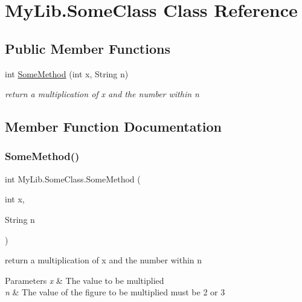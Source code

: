 \hypertarget{class_my_lib_1_1_some_class}{}\section{My\+Lib.\+Some\+Class Class Reference}
\label{class_my_lib_1_1_some_class}
\subsection*{Public Member Functions}
\begin{DoxyCompactItemize}
\item 
int \mbox{\hyperlink{class_my_lib_1_1_some_class_a9fbf42177002a01f663469744423d9ff}{Some\+Method}} (int x, String n)
\begin{DoxyCompactList}\small\item\em return a multiplication of x and the number within n \end{DoxyCompactList}\end{DoxyCompactItemize}


\subsection{Member Function Documentation}
\mbox{\label{class_my_lib_1_1_some_class_a9fbf42177002a01f663469744423d9ff}} 
\subsubsection{\texorpdfstring{SomeMethod()}{SomeMethod()}}
{\footnotesize\ttfamily int My\+Lib.\+Some\+Class.\+Some\+Method (\begin{DoxyParamCaption}\item[{int}]{x,  }\item[{String}]{n }\end{DoxyParamCaption})\hspace{0.3cm}{\ttfamily [inline]}}



return a multiplication of x and the number within n 


\begin{DoxyParams}{Parameters}
{\em x} & The value to be multiplied\\
\hline
{\em n} & The value of the figure to be multiplied must be \textquotesingle{}2\textquotesingle{} or \textquotesingle{}3\textquotesingle{}\\
\hline
\end{DoxyParams}

